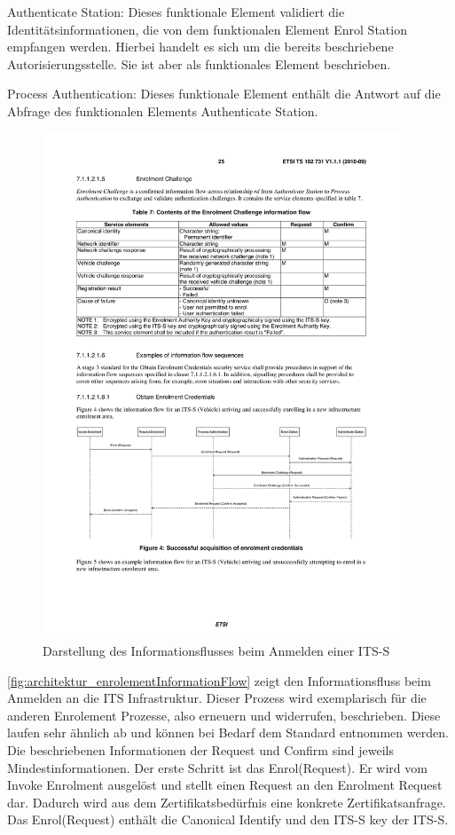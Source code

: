 Authenticate Station: Dieses funktionale Element validiert die Identitätsinformationen, die von dem funktionalen Element Enrol Station empfangen werden. Hierbei handelt es sich um die bereits beschriebene Autorisierungsstelle. Sie ist aber als funktionales Element beschrieben.

Process Authentication: Dieses funktionale Element enthält die Antwort auf die Abfrage des funktionalen Elements  Authenticate Station.

\begin{figure}[h]
	\includegraphics[width=0.95\textwidth]{content/images/02_architektur/enrolementFlowDiagramm.pdf}
	\caption{Darstellung des Informationsflusses beim Anmelden einer \ac{ITS-S} \cite{ts102731}}
\end{figure}

\autoref{fig:architektur_enrolementInformationFlow} zeigt den Informationsfluss beim Anmelden an die \ac{ITS} Infrastruktur. Dieser Prozess wird exemplarisch für die anderen Enrolement Prozesse, also erneuern und widerrufen, beschrieben. Diese laufen sehr ähnlich ab und können bei Bedarf dem Standard \cite{ts102731} entnommen werden. Die beschriebenen Informationen der Request und Confirm sind jeweils Mindestinformationen. 
Der erste Schritt ist das Enrol(Request). Er wird vom Invoke Enrolment ausgelöst und stellt einen Request an den Enrolment Request dar. Dadurch wird aus dem Zertifikatsbedürfnis eine konkrete Zertifikatsanfrage. Das Enrol(Request) enthält die Canonical Identify und den \ac{ITS-S} key der \ac{ITS-S}.  

